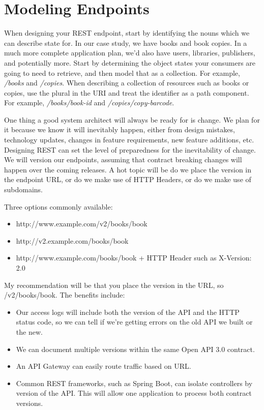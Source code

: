 \section{Modeling Endpoints}

When designing your REST endpoint, start by identifying the nouns which we can describe state for.  In our case study, we have books and book copies.  In a much more complete application plan, we'd also have users, libraries, publishers, and potentially more.  Start by determining the object states your consumers are going to need to retrieve, and then model that as a collection.  For example, \textit{/books} and \textit{/copies}.  When describing a collection of resources such as books or copies, use the plural in the URI and treat the identifier as a path component.  For example, \textit{/books/book-id} and \textit{/copies/copy-barcode}.

One thing a good system architect will always be ready for is change.  We plan for it because we know it will inevitably happen, either from design mistakes, technology updates, changes in feature requirements, new feature additions, etc.  Designing REST can set the level of preparedness for the inevitability of change.  We will version our endpoints, assuming that contract breaking changes will happen over the coming releases.  A hot topic will be do we place the version in the endpoint URL, or do we make use of HTTP Headers, or do we make use of subdomains.

Three options commonly available:

\begin{itemize}
  \item http://www.example.com/v2/books/book
  \item http://v2.example.com/books/book
  \item http://www.example.com/books/book + HTTP Header such as X-Version: 2.0
\end{itemize}

My recommendation will be that you place the version in the URL, so /v2/books/book.  The benefits include:
\begin{itemize}
  \item Our access logs will include both the version of the API and the HTTP status code, so we can tell if we're getting errors on the old API we built or the new.
  \item We can document multiple versions within the same Open API 3.0 contract.
  \item An API Gateway can easily route traffic based on URL.
  \item Common REST frameworks, such as Spring Boot, can isolate controllers by version of the API.  This will allow one application to process both contract versions.
\end{itemize}

